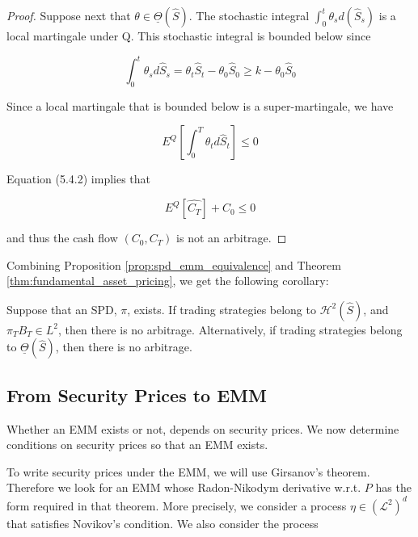 \documentclass[\topdir/lecture\_notes.tex]{subfiles}
\begin{document}
\begin{proof}
Suppose next that \(\theta \in \underline{\Theta}(\hat{S})\). The stochastic integral \(\int_{0}^{t} \theta_{s} d\left(\hat{S}_{s}\right)\) is a local martingale under Q. This stochastic integral is bounded below since

\begin{equation*}
\int_{0}^{t} \theta_{s} d \hat{S}_{s}=\theta_{t} \hat{S}_{t}-\theta_{0} \hat{S}_{0} \geq k-\theta_{0} \hat{S}_{0}
\end{equation*}

Since a local martingale that is bounded below is a super-martingale, we have

\begin{equation*}
E^{Q}\left[\int_{0}^{T} \theta_{t} d \hat{S}_{t}\right] \leq 0
\end{equation*}

Equation (5.4.2) implies that

\begin{equation*}
E^{Q}\left[\hat{C_{T}}\right]+C_{0} \leq 0
\end{equation*}

and thus the cash flow \(\left(C_{0}, C_{T}\right)\) is not an arbitrage.
\end{proof}

Combining Proposition \ref{prop:spd_emm_equivalence} and Theorem \ref{thm:fundamental_asset_pricing}, we get the following corollary:

\begin{corollary}\label{cor:no_arbitrage_conditions}
Suppose that an SPD, \(\pi\), exists. If trading strategies belong to \(\mathcal{H}^{2}(\hat{S})\), and \(\pi_{T} B_{T} \in L^{2}\), then there is no arbitrage. Alternatively, if trading strategies belong to \(\underline{\Theta}(\hat{S})\), then there is no arbitrage.
\end{corollary}

\subsection{From Security Prices to EMM}
Whether an EMM exists or not, depends on security prices. We now determine conditions on security prices so that an EMM exists.

To write security prices under the EMM, we will use Girsanov's theorem. Therefore we look for an EMM whose Radon-Nikodym derivative w.r.t. \(P\) has the form required in that theorem. More precisely, we consider a process \(\eta \in\left(\mathcal{L}^{2}\right)^{d}\) that satisfies Novikov's condition. We also consider the process
\end{document}
